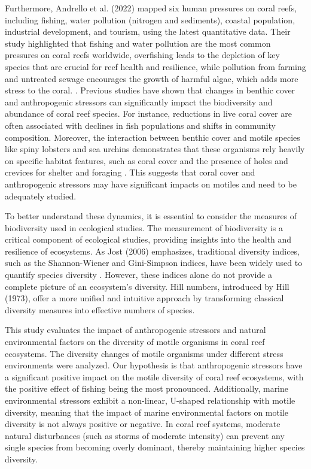 \documentclass[a4paper, 11]{article}
\begin{document}
Furthermore, Andrello et al. (2022) mapped six human pressures on coral reefs, including fishing, water pollution (nitrogen and sediments), coastal population, industrial development, and tourism, using the latest quantitative data. Their study highlighted that fishing and water pollution are the most common pressures on coral reefs worldwide, overfishing leads to the depletion of key species that are crucial for reef health and resilience, while pollution from farming and untreated sewage encourages the growth of harmful algae, which adds more stress to the coral. \citep{andrello2022global}. Previous studies have shown that changes in benthic cover and anthropogenic stressors can significantly impact the biodiversity and abundance of coral reef species. For instance, reductions in live coral cover are often associated with declines in fish populations and shifts in community composition. Moreover, the interaction between benthic cover and motile species like spiny lobsters and sea urchins demonstrates that these organisms rely heavily on specific habitat features, such as coral cover and the presence of holes and crevices for shelter and foraging \citep{zapata2021diel}. This suggests that coral cover and anthropogenic stressors may have significant impacts on motiles and need to be adequately studied. 

To better understand these dynamics, it is essential to consider the measures of biodiversity used in ecological studies. The measurement of biodiversity is a critical component of ecological studies, providing insights into the health and resilience of ecosystems. As Jost (2006) emphasizes, traditional diversity indices, such as the Shannon-Wiener and Gini-Simpson indices, have been widely used to quantify species diversity \citep{jost2006entropy}. However, these indices alone do not provide a complete picture of an ecosystem's diversity. Hill numbers, introduced by Hill (1973), offer a more unified and intuitive approach by transforming classical diversity measures into effective numbers of species. 

This study evaluates the impact of anthropogenic stressors and natural environmental factors on the diversity of motile organisms in coral reef ecosystems. The diversity changes of motile organisms under different stress environments were analyzed. Our hypothesis is that anthropogenic stressors have a significant positive impact on the motile diversity of coral reef ecosystems, with the positive effect of fishing being the most pronounced. Additionally, marine environmental stressors exhibit a non-linear, U-shaped relationship with motile diversity, meaning that the impact of marine environmental factors on motile diversity is not always positive or negative. In coral reef systems, moderate natural disturbances (such as storms of moderate intensity) can prevent any single species from becoming overly dominant, thereby maintaining higher species diversity\citep{connell1978diversity}.
\end{document}
